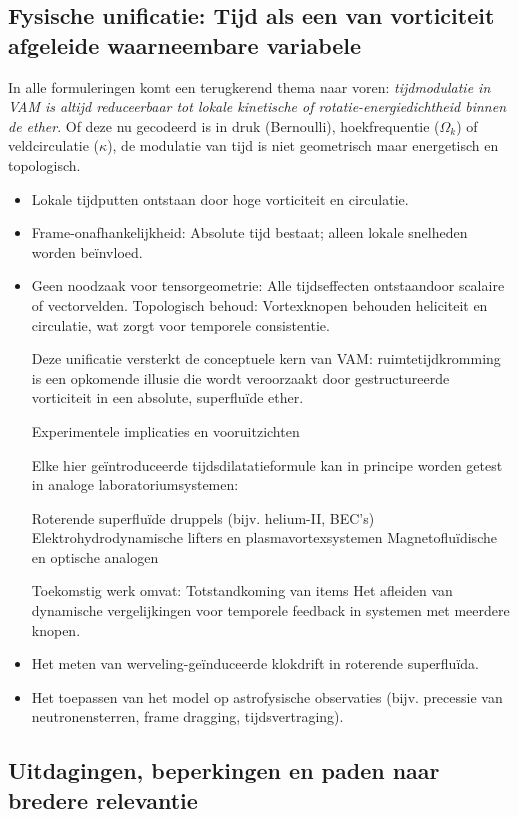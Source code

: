 \subsection{Fysische unificatie: Tijd als een van vorticiteit afgeleide waarneembare variabele}

In alle formuleringen komt een terugkerend thema naar voren: \textit{tijdmodulatie in VAM is altijd reduceerbaar tot lokale kinetische of rotatie-energiedichtheid binnen de ether}. Of deze nu gecodeerd is in druk (Bernoulli), hoekfrequentie (\( \Omega_k \)) of veldcirculatie (\( \kappa \)), de modulatie van tijd is niet geometrisch maar energetisch en topologisch.

\begin{itemize}
\item Lokale tijdputten ontstaan ​​door hoge vorticiteit en circulatie.
\item Frame-onafhankelijkheid: Absolute tijd bestaat; alleen lokale snelheden worden beïnvloed.
\item Geen noodzaak voor tensorgeometrie: Alle tijdseffecten ontstaan ​​door scalaire of vectorvelden.
Topologisch behoud: Vortexknopen behouden heliciteit en circulatie, wat zorgt voor temporele consistentie.

Deze unificatie versterkt de conceptuele kern van VAM: ruimtetijdkromming is een opkomende illusie die wordt veroorzaakt door gestructureerde vorticiteit in een absolute, superfluïde ether.

Experimentele implicaties en vooruitzichten

Elke hier geïntroduceerde tijdsdilatatieformule kan in principe worden getest in analoge laboratoriumsystemen:

Roterende superfluïde druppels (bijv. helium-II, BEC's)
Elektrohydrodynamische lifters en plasmavortexsystemen
Magnetofluïdische en optische analogen

Toekomstig werk omvat:
Totstandkoming van items
Het afleiden van dynamische vergelijkingen voor temporele feedback in systemen met meerdere knopen. \item Het meten van werveling-geïnduceerde klokdrift in roterende superfluïda.
\item Het toepassen van het model op astrofysische observaties (bijv. precessie van neutronensterren, frame dragging, tijdsvertraging).
\end{itemize}

\subsection{Uitdagingen, beperkingen en paden naar bredere relevantie}

